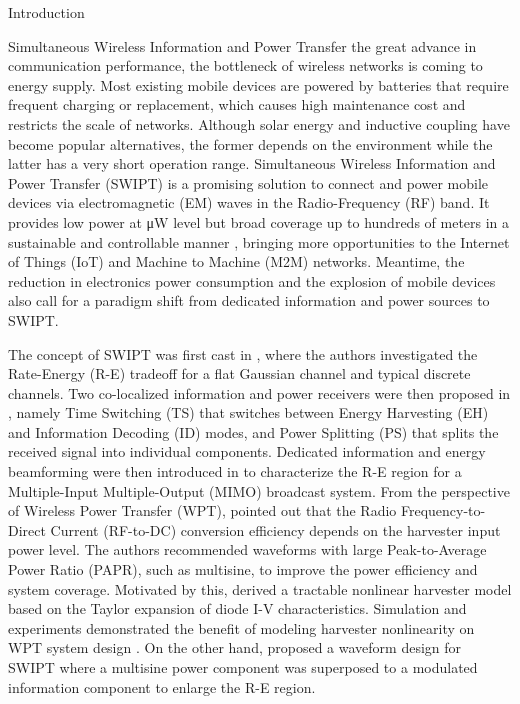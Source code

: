 \documentclass[journal]{IEEEtran}
\begin{document}
	\begin{section}{Introduction}
		\begin{subsection}{Simultaneous Wireless Information and Power Transfer}
			 the great advance in communication performance, the bottleneck of wireless networks is coming to energy supply. Most existing mobile devices are powered by batteries that require frequent charging or replacement, which causes high maintenance cost and restricts the scale of networks. Although solar energy and inductive coupling have become popular alternatives, the former depends on the environment while the latter has a very short operation range. Simultaneous Wireless Information and Power Transfer (SWIPT) is a promising solution to connect and power mobile devices via electromagnetic (EM) waves in the Radio-Frequency (RF) band. It provides low power at \si{\uW} level but broad coverage up to hundreds of meters in a sustainable and controllable manner \cite{Clerckx2018a}, bringing more opportunities to the Internet of Things (IoT) and Machine to Machine (M2M) networks. Meantime, the reduction in electronics power consumption and the explosion of mobile devices also call for a paradigm shift from dedicated information and power sources to SWIPT.

			The concept of SWIPT was first cast in \cite{Varshney2008}, where the authors investigated the Rate-Energy (R-E) tradeoff for a flat Gaussian channel and typical discrete channels. Two co-localized information and power receivers were then proposed in \cite{Zhou2013}, namely Time Switching (TS) that switches between Energy Harvesting (EH) and Information Decoding (ID) modes, and Power Splitting (PS) that splits the received signal into individual components. Dedicated information and energy beamforming were then introduced in \cite{Zhang2013} to characterize the R-E region for a Multiple-Input Multiple-Output (MIMO) broadcast system. From the perspective of Wireless Power Transfer (WPT), \cite{Trotter2009} pointed out that the Radio Frequency-to-Direct Current (RF-to-DC) conversion efficiency depends on the harvester input power level. The authors recommended waveforms with large Peak-to-Average Power Ratio (PAPR), such as multisine, to improve the power efficiency and system coverage. Motivated by this, \cite{Clerckx2016a} derived a tractable nonlinear harvester model based on the Taylor expansion of diode I-V characteristics. Simulation and experiments demonstrated the benefit of modeling harvester nonlinearity on WPT system design \cite{Kim2019,Kim2019a}. On the other hand, \cite{Clerckx2018b} proposed a waveform design for SWIPT where a multisine power component was superposed to a modulated information component to enlarge the R-E region.
		\end{subsection}



\end{section}
\end{document}
